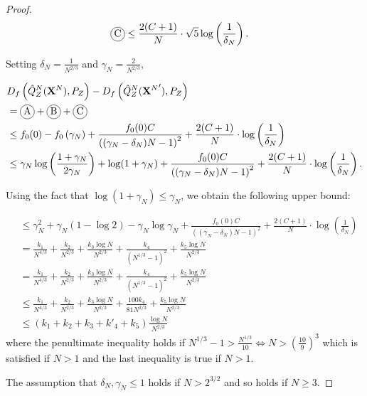 \begin{proof}
\begin{align*}
    \encircle{C} &\leq \frac{2(C+1)}{N} \cdot \sqrt{5}\log\left(\frac{1}{\delta_N}\right).
\end{align*}


Setting $\delta_N = \frac{1}{N^{2/3}}$ and $\gamma_N = \frac{2}{N^{2/3}}$,

\begin{align*}
    &D_f\left( \hat{Q}_Z^N(\XN) , P_Z\right) - D_f\left( \hat{Q}_Z^N({\XN}') , P_Z\right) \\
    &= \encircle{A} + \encircle{B} + \encircle{C} \\
    &\leq f_0(0) - f_0\left(\gamma_N\right) + \frac{f_0(0)C}{\left((\gamma_N-\delta_N)N - 1\right)^2} + \frac{2(C+1)}{N} \cdot \log\left(\frac{1}{\delta_N}\right) \\
    &\leq \gamma_N \log\left(\frac{1+\gamma_N}{2\gamma_N}\right) + \log(1+\gamma_N) + \frac{f_0(0)C}{\left((\gamma_N-\delta_N)N - 1\right)^2} + \frac{2(C+1)}{N} \cdot \log\left(\frac{1}{\delta_N}\right).\\
\end{align*}

Using the fact that $\log(1+\gamma_N)\leq \gamma_N$, we obtain the following upper bound:

\begin{align*}
    &\leq \gamma_N^2 + \gamma_N(1-\log 2 ) - \gamma_N \log \gamma_N + \frac{f_0(0)C}{\left((\gamma_N-\delta_N)N - 1\right)^2} + \frac{2(C+1)}{N} \cdot \log\left(\frac{1}{\delta_N}\right)\\
    &= \frac{k_1}{N^{4/3}} + \frac{k_2}{N^{2/3}} + \frac{k_3\log N}{N^{2/3}} + \frac{k_4}{(N^{1/3} - 1)^2} +\frac{k_5 \log N }{ N^{2/3}} \\
    &= \frac{k_1}{N^{4/3}} + \frac{k_2}{N^{2/3}} + \frac{k_3\log N}{N^{2/3}} + \frac{k_4}{(N^{1/3} - 1)^2} +\frac{k_5 \log N }{ N^{2/3}} \\
    &\leq \frac{k_1}{N^{4/3}} + \frac{k_2}{N^{2/3}} + \frac{k_3\log N}{N^{2/3}} + \frac{100k_4}{81N^{2/3}} +\frac{k_5 \log N }{ N^{2/3}} \\
    &\leq (k_1+k_2+k_3+k'_4 + k_5)\frac{\log N}{N^{2/3}}
\end{align*}
where the penultimate inequality holds if $N^{1/3}-1 > \frac{N^{1/3}}{10} \iff N>\left(\frac{10}{9}\right)^3$ which is satisfied if $N>1$ and the last inequality is true if $N>1$.

The assumption that $\delta_N, \gamma_N \leq 1$ holds if $N>2^{3/2}$ and so holds if $N\geq3$.


\end{proof}
